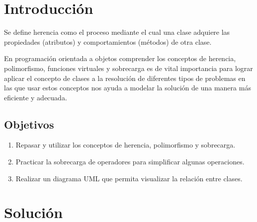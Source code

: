 \newpage
\section{Introducción}

Se define herencia como el proceso mediante el cual una clase adquiere las propiedades (atributos) y comportamientos (métodos) de otra clase. 

En programación orientada a objetos comprender los conceptos de herencia, polimorfismo, funciones virtuales y sobrecarga es de vital importancia para lograr aplicar el concepto de clases a la resolución de diferentes tipos de problemas en las que usar estos conceptos nos ayuda a modelar la solución de una manera más eficiente y adecuada. 

\subsection{Objetivos}
\begin{enumerate}
\item Repasar y utilizar los conceptos de herencia, polimorfismo y sobrecarga. 
\item Practicar la sobrecarga de operadores para simplificar algunas operaciones.
\item Realizar un diagrama UML que permita visualizar la relación entre clases. 
\end{enumerate}



\section{Solución}

